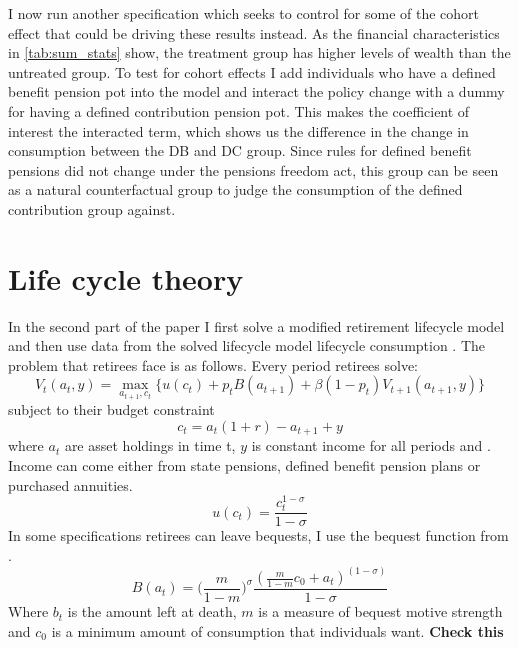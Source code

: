 \documentclass[12pt]{article}
\begin{document}
I now run another specification which seeks to control for some of the cohort effect that
could be driving these results instead. As the financial characteristics in \ref{tab:sum_stats}
show, the treatment group has higher levels of wealth than the untreated group. To test
for cohort effects I add individuals who have a defined benefit pension pot into the model
and interact the policy change with a dummy for having a defined contribution pension pot.
This makes the coefficient of interest the interacted term, which shows us the difference
in the change in consumption between the DB and DC group. Since rules for defined benefit
pensions did not change under the pensions freedom act, this group can be seen as a natural counterfactual
group to judge the consumption of the defined contribution group against.





\section{Life cycle theory}

In the second part of the paper I first solve a modified retirement lifecycle model and then use data from the solved lifecycle
model
lifecycle consumption
. The problem that retirees face is as follows.
Every period retirees solve:
\begin{equation*}
    V_{t}(a_{t}, y) = \underset{a_{t+1}, c_{t}}{\max} \{ u(c_{t}) + p_{t}B(a_{t+1}) + \beta(1-p_{t})V_{t+1}(a_{t+1}, y) \}
\end{equation*}
subject to their budget constraint
\begin{equation*}
    c_{t} =a_{
    t}(1 +r) -  a_{t+1} + y
\end{equation*}
where $a_{t}$ are asset holdings in time t, $y$ is constant income for all periods and . Income can come either
from state pensions, defined benefit pension plans or purchased annuities.
\begin{equation*}
    u(c_{t}) = \frac{c_{t}^{1 - \sigma}}{1 - \sigma}
\end{equation*} In some specifications retirees can leave bequests, I use the bequest function from
\cite{lockwood_red_2012}.
\begin{equation*}
    B(a_{t}) = \bigl( \frac{m}{1 - m} \bigr)^{\sigma}  \frac{(\frac{m}{1 - m}c_{0} + a_{t})^{(1 - \sigma)}}{1 - \sigma}
\end{equation*}
Where $b_{t}$ is the amount left at death, $m$ is a measure of bequest motive strength and $c_{0}$ is
a minimum amount of consumption that individuals want. \textbf{Check this}
\end{document}
